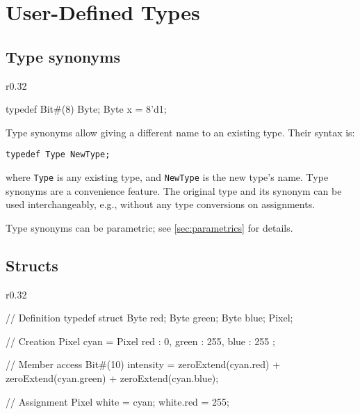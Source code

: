 \section{User-Defined Types}
\label{sec:userdefined}

\subsection{Type synonyms}
\label{sec:synonyms}

\begin{wrapfigure}{r}{0.32\columnwidth}
\vspace{-2em}
\begin{mscode}
typedef Bit#(8) Byte;
Byte x = 8'd1;
\end{mscode}
\vspace{-2em}
\end{wrapfigure}

Type synonyms allow giving a different name to an existing type. Their syntax is:
\begin{center}
\verb|typedef Type NewType;|
\end{center}
where \verb|Type| is any existing type, and \verb|NewType| is the new type's name.
Type synonyms are a convenience feature. The original type and its synonym can be used interchangeably,
e.g., without any type conversions on assignments.

Type synonyms can be parametric; see \autoref{sec:parametrics} for details.

\subsection{Structs}
\label{sec:structs}

\begin{wrapfigure}{r}{0.32\columnwidth}
\vspace{-4.5em}
\begin{mscode}
// Definition
typedef struct {
  Byte red;
  Byte green;
  Byte blue;
} Pixel;

// Creation
Pixel cyan = Pixel{
  red : 0,
  green : 255,
  blue : 255
};

// Member access
Bit#(10) intensity =
  zeroExtend(cyan.red) +
  zeroExtend(cyan.green) +
  zeroExtend(cyan.blue);

// Assignment
Pixel white = cyan;
white.red = 255;
\end{mscode}
\vspace{-6em}
\end{wrapfigure}

